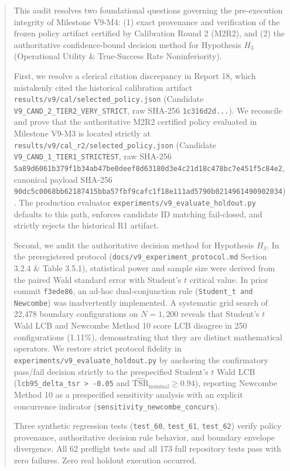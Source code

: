 \documentclass[10pt,a4paper]{article}
\begin{document}
\begin{abstract}
\noindent This audit resolves two foundational questions governing the pre-execution integrity of Milestone V9-M4: (1) exact provenance and verification of the frozen policy artifact certified by Calibration Round 2 (M2R2), and (2) the authoritative confidence-bound decision method for Hypothesis $H_3$ (Operational Utility \& True-Success Rate Noninferiority).

First, we resolve a clerical citation discrepancy in Report 18, which mistakenly cited the historical calibration artifact \texttt{results/v9/cal/selected\_policy.json} (Candidate \texttt{V9\_CAND\_2\_TIER2\_VERY\_STRICT}, raw SHA-256 \texttt{1c316d2d...}). We reconcile and prove that the authoritative M2R2 certified policy evaluated in Milestone V9-M3 is located strictly at \texttt{results/v9/cal\_r2/selected\_policy.json} (Candidate \texttt{V9\_CAND\_1\_TIER1\_STRICTEST}, raw SHA-256 \texttt{5a89d6061b379f1b34ab47be0deef8d63180d3e4c21d18c478bc7e451f5c84e2}, canonical payload SHA-256 \texttt{90dc5c0068bb62187415bba57fbf9cafc1f18e111ad5790b0214961490902034}). The production evaluator \texttt{experiments/v9\_evaluate\_holdout.py} defaults to this path, enforces candidate ID matching fail-closed, and strictly rejects the historical R1 artifact.

Second, we audit the authoritative decision method for Hypothesis $H_3$. In the preregistered protocol (\texttt{docs/v9\_experiment\_protocol.md} Section 3.2.4 \& Table 3.5.1), statistical power and sample size were derived from the paired Wald standard error with Student's $t$ critical value. In prior commit \texttt{f3ede86}, an ad-hoc dual-conjunction rule (\texttt{Student\_t and Newcombe}) was inadvertently implemented. A systematic grid search of 22,478 boundary configurations on $N = 1,200$ reveals that Student's $t$ Wald LCB and Newcombe Method 10 score LCB disagree in 250 configurations (1.11\%), demonstrating that they are distinct mathematical operators. We restore strict protocol fidelity in \texttt{experiments/v9\_evaluate\_holdout.py} by anchoring the confirmatory pass/fail decision strictly to the prespecified Student's $t$ Wald LCB (\texttt{lcb95\_delta\_tsr > -0.05} and $\widehat{\mathrm{TSR}}_{\mathrm{nominal}} \ge 0.94$), reporting Newcombe Method 10 as a prespecified sensitivity analysis with an explicit concurrence indicator (\texttt{sensitivity\_newcombe\_concurs}).

Three synthetic regression tests (\texttt{test\_60}, \texttt{test\_61}, \texttt{test\_62}) verify policy provenance, authoritative decision rule behavior, and boundary envelope divergence. All 62 preflight tests and all 173 full repository tests pass with zero failures. Zero real holdout execution occurred.
\end{abstract}
\end{document}
